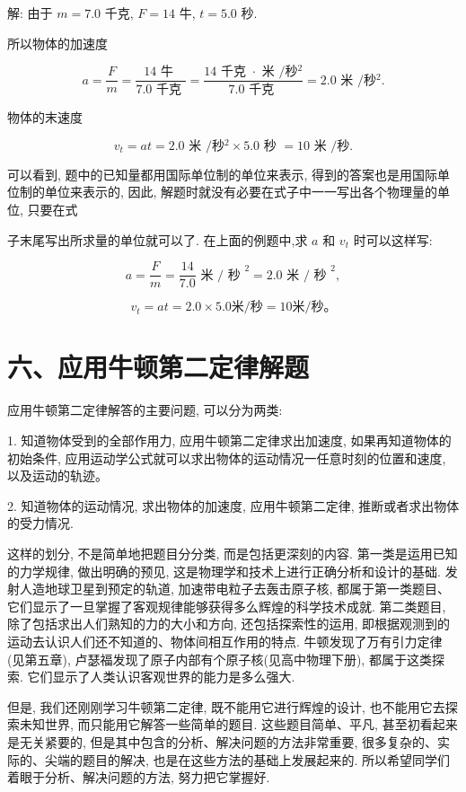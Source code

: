 \documentclass[10pt]{article}
\begin{document}
解: 由于 \(m = {7.0}\) 千克, \(F = {14}\) 牛, \(t = {5.0}\) 秒.

所以物体的加速度

\[
a = \frac{F}{m} = \frac{{14}\text{ 牛 }}{{7.0}\text{ 千克 }} = \frac{{14}\text{ 千克 } \cdot \text{ 米 }/秒{}^{2}}{{7.0}\text{ 千克 }} = {2.0}\text{ 米 }/秒{}^{2}.
\]

物体的末速度

\[
{v}_{t} = {at} = {2.0}\text{ 米 }/秒{}^{2} \times {5.0}\text{ 秒 } = {10}\text{ 米 }/秒.
\]

可以看到, 题中的已知量都用国际单位制的单位来表示, 得到的答案也是用国际单位制的单位来表示的, 因此, 解题时就没有必要在式子中一一写出各个物理量的单位, 只要在式

子末尾写出所求量的单位就可以了. 在上面的例题中,求 \(a\) 和 \({v}_{t}\) 时可以这样写:

\[
a = \frac{F}{m} = \frac{14}{7.0}\text{ 米 }/{\text{ 秒 }}^{2} = {2.0}\text{ 米 }/{\text{ 秒 }}^{2},
\]

\[
{v}_{t} = {at} = {2.0} \times {5.0}\text{米}/\text{秒} = {10}\text{米}/\text{秒。}
\]

\section*{六、应用牛顿第二定律解题}

应用牛顿第二定律解答的主要问题, 可以分为两类:

1. 知道物体受到的全部作用力, 应用牛顿第二定律求出加速度, 如果再知道物体的初始条件, 应用运动学公式就可以求出物体的运动情况一任意时刻的位置和速度, 以及运动的轨迹。

2. 知道物体的运动情况, 求出物体的加速度, 应用牛顿第二定律, 推断或者求出物体的受力情况.

这样的划分, 不是简单地把题目分分类, 而是包括更深刻的内容. 第一类是运用已知的力学规律, 做出明确的预见, 这是物理学和技术上进行正确分析和设计的基础. 发射人造地球卫星到预定的轨道, 加速带电粒子去轰击原子核, 都属于第一类题目、它们显示了一旦掌握了客观规律能够获得多么辉煌的科学技术成就. 第二类题目, 除了包括求出人们熟知的力的大小和方向, 还包括探索性的运用, 即根据观测到的运动去认识人们还不知道的、物体间相互作用的特点. 牛顿发现了万有引力定律 (见第五章), 卢瑟福发现了原子内部有个原子核(见高中物理下册), 都属于这类探索. 它们显示了人类认识客观世界的能力是多么强大.

但是, 我们还刚刚学习牛顿第二定律, 既不能用它进行辉煌的设计, 也不能用它去探索未知世界, 而只能用它解答一些简单的题目. 这些题目简单、平凡, 甚至初看起来是无关紧要的, 但是其中包含的分析、解决问题的方法非常重要, 很多复杂的、实际的、尖端的题目的解决, 也是在这些方法的基础上发展起来的. 所以希望同学们着眼于分析、解决问题的方法, 努力把它掌握好.
\end{document}

